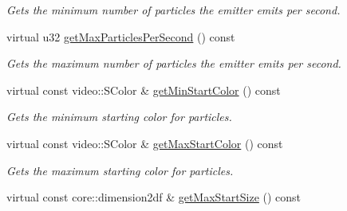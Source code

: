\begin{DoxyCompactItemize}
\begin{DoxyCompactList}\small\item\em Gets the minimum number of particles the emitter emits per second. \end{DoxyCompactList}\item 
\hypertarget{classirr_1_1scene_1_1_c_particle_ring_emitter_a0928984c471a5113bedc91e627d90b71}{virtual u32 \hyperlink{classirr_1_1scene_1_1_c_particle_ring_emitter_a0928984c471a5113bedc91e627d90b71}{get\-Max\-Particles\-Per\-Second} () const }\label{classirr_1_1scene_1_1_c_particle_ring_emitter_a0928984c471a5113bedc91e627d90b71}

\begin{DoxyCompactList}\small\item\em Gets the maximum number of particles the emitter emits per second. \end{DoxyCompactList}\item 
\hypertarget{classirr_1_1scene_1_1_c_particle_ring_emitter_ac6dc96ec6834b2307dd3c14dca51c70f}{virtual const video\-::\-S\-Color \& \hyperlink{classirr_1_1scene_1_1_c_particle_ring_emitter_ac6dc96ec6834b2307dd3c14dca51c70f}{get\-Min\-Start\-Color} () const }\label{classirr_1_1scene_1_1_c_particle_ring_emitter_ac6dc96ec6834b2307dd3c14dca51c70f}

\begin{DoxyCompactList}\small\item\em Gets the minimum starting color for particles. \end{DoxyCompactList}\item 
\hypertarget{classirr_1_1scene_1_1_c_particle_ring_emitter_a22a0c4b5ff7913c6b77ab9d153ef6fd0}{virtual const video\-::\-S\-Color \& \hyperlink{classirr_1_1scene_1_1_c_particle_ring_emitter_a22a0c4b5ff7913c6b77ab9d153ef6fd0}{get\-Max\-Start\-Color} () const }\label{classirr_1_1scene_1_1_c_particle_ring_emitter_a22a0c4b5ff7913c6b77ab9d153ef6fd0}

\begin{DoxyCompactList}\small\item\em Gets the maximum starting color for particles. \end{DoxyCompactList}\item 
\hypertarget{classirr_1_1scene_1_1_c_particle_ring_emitter_a6ea07474c772b110a7c274da31030af1}{virtual const core\-::dimension2df \& \hyperlink{classirr_1_1scene_1_1_c_particle_ring_emitter_a6ea07474c772b110a7c274da31030af1}{get\-Max\-Start\-Size} () const }\label{classirr_1_1scene_1_1_c_particle_ring_emitter_a6ea07474c772b110a7c274da31030af1}


\end{DoxyCompactItemize}
